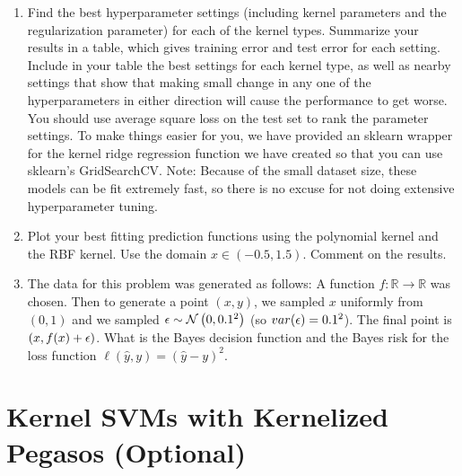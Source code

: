\documentclass{article}
\theoremstyle{plain}
\theoremstyle{definition}
\begin{document}
\begin{enumerate}
\item Find the best hyperparameter settings (including kernel parameters
and the regularization parameter) for each of the kernel types. Summarize
your results in a table, which gives training error and test error
for each setting. Include in your table the best settings for each
kernel type, as well as nearby settings that show that making small
change in any one of the hyperparameters in either direction will
cause the performance to get worse. You should use average square
loss on the test set to rank the parameter settings. To make things
easier for you, we have provided an sklearn wrapper for the kernel
ridge regression function we have created so that you can use sklearn's
GridSearchCV. Note: Because of the small dataset size, these models
can be fit extremely fast, so there is no excuse for not doing extensive
hyperparameter tuning. 
\item Plot your best fitting prediction functions using the polynomial kernel
and the RBF kernel. Use the domain $x\in\left(-0.5,1.5\right)$. Comment
on the results. 
\item The data for this problem was generated as follows: A function $f:\mathbb{R}\to\mathbb{R}$
was chosen. Then to generate a point $\left(x,y\right)$, we sampled
$x$ uniformly from $(0,1)$ and we sampled ${\epsilon}\sim\mathcal{N}\left(0,0.1^{2}\right)$
(so $var({\epsilon})=0.1^{2}$). The final point is $\left(x,f(x)+{\epsilon}\right)$.
What is the Bayes decision function and the Bayes risk for the loss
function $\ell\left(\hat{y},y\right)=\left(\hat{y}-y\right)^{2}$.\\

\setcounter{saveenum}{\value{enumi}}
\end{enumerate}


\section{Kernel SVMs with Kernelized
Pegasos (Optional)}
\end{document}

